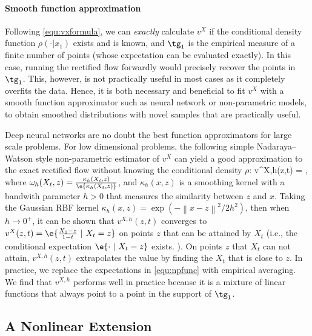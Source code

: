 \documentclass[11pt]{article}
\newcommand{\norm}[1]{\left\|#1\right\|}
\begin{document}
\paragraph{Smooth function approximation}
%
Following \eqref{equ:vxformula}, 
we can \emph{exactly} calculate $v^X$ 
if the conditional density function $\rho(\cdot|x_1)$ exists and is known, 
and $\tg_1$ is the empirical measure of a finite number of points (whose expectation can be evaluated exactly). 
In this case, running the rectified flow 
forwardly would 
precisely recover the points in $\tg_1$. 
This, however, is not practically useful in most cases as it completely overfits the data.
Hence, it is both necessary and beneficial 
to fit 
$v^X$ with a smooth function approximator such as neural network or non-parametric models, 
to obtain 
smoothed distributions  
with novel samples 
that  are %
practically useful.  







Deep neural networks are no doubt the best function approximators for large scale problems. 
For low dimensional problems, 
the following simple Nadaraya–Watson style non-parametric estimator of  $v^X$ 
can yield a good approximation to the exact rectified flow 
without knowing
the conditional density $\rho$: 
\bbb \label{equ:npfunc}
v^{X,h}(z,t) 
=  ,  %
\eee  
where $\omega_h(X_t,z) = \frac{\kappa_h(X_t, z)}{\e{\kappa_h( X_t,z)}} $, and  $\kappa_h(x,z)$ is a smoothing kernel with a bandwith parameter $h>0$ 
that measures the similarity between $z$ and $x$.  
Taking the Gaussian RBF kernel $\kappa_h(x, z) = \exp(-\norm{x-z}^2/2h^2)$, 
then when $h\to 0^+$, 
it can be shown that 
$v^{X,h}(z,t)$   converges to $v^X(z,t) = \e{\frac{X_1-z}{1-t} ~|~X_t=z}$
on points $z$ 
that can be attained by $X_t$ (i.e., the conditional expectation $\e{\cdot~|~X_t = z}$ exists. ). 
On points $z$ that $X_t$ can not attain, 
$v^{X,h}(z,t)$ extrapolates the value by finding the $X_t$ that is close to $z$. 
In practice, we replace the expectations in \eqref{equ:npfunc} with empirical averaging. 
We find that $v^{X,h}$ performs well in practice 
because it is a mixture of linear functions that always point to a point 
in the support of $\tg_1$. 











\subsection{A Nonlinear Extension} %
\label{sec:nonlinear}
\end{document}

